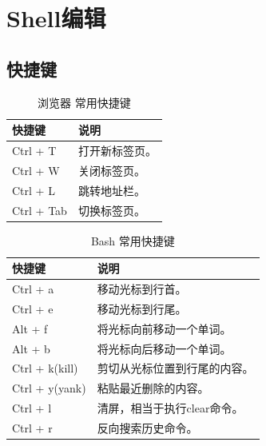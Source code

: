 \section{Shell编辑}
\subsection{快捷键}
\begin{table}[H]
	\centering
	\begin{tabular}{|l|l|}
		\hline
		\textbf{快捷键} & \textbf{说明} \\
		\hline
		Ctrl + T     & 打开新标签页。     \\
		\hline
		Ctrl + W     & 关闭标签页。      \\
		\hline
		Ctrl + L     & 跳转地址栏。      \\
		\hline
		Ctrl + Tab   & 切换标签页。      \\
		\hline
	\end{tabular}
	\caption{浏览器 常用快捷键}
\end{table}

\begin{table}[H]
	\centering
	\begin{tabular}{|l|l|}
		\hline
		\textbf{快捷键}   & \textbf{说明}      \\
		\hline
		Ctrl + a       & 移动光标到行首。         \\
		\hline
		Ctrl + e       & 移动光标到行尾。         \\
		\hline
		Alt + f        & 将光标向前移动一个单词。     \\
		\hline
		Alt + b        & 将光标向后移动一个单词。     \\
		\hline
		Ctrl + k(kill) & 剪切从光标位置到行尾的内容。   \\
		\hline
		Ctrl + y(yank) & 粘贴最近删除的内容。       \\
		\hline
		Ctrl + l       & 清屏，相当于执行clear命令。 \\
		\hline
		Ctrl + r       & 反向搜索历史命令。        \\
		\hline
	\end{tabular}
	\caption{Bash 常用快捷键}
\end{table}

